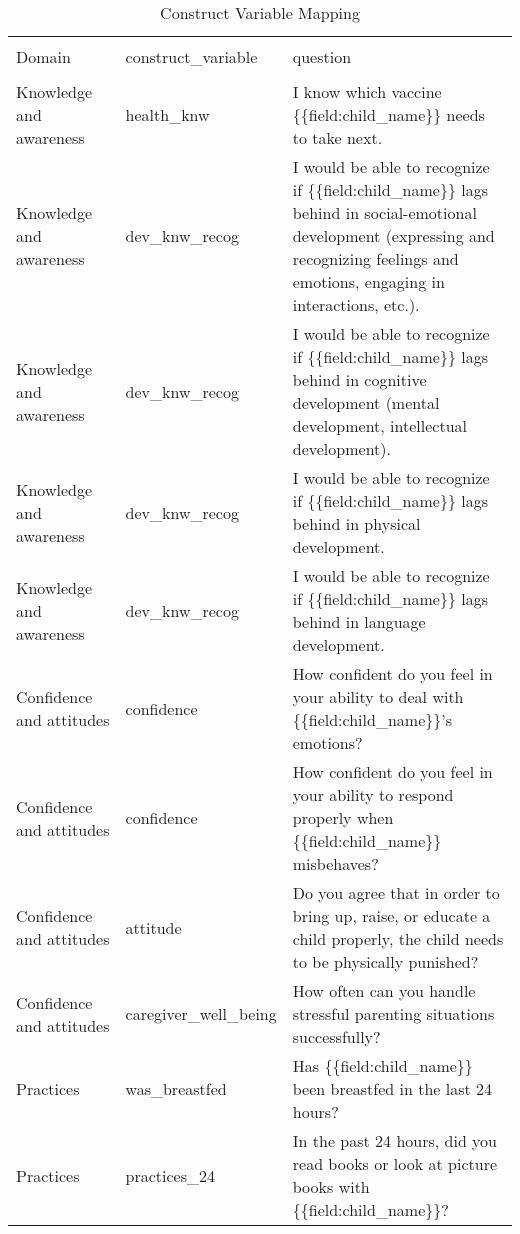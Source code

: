 
\begin{table}[!htbp] \centering
  \caption{Construct Variable Mapping}
  \label{tbl:Construct Variable Mapping}
\begin{tabular}{@{\extracolsep{5pt}} p{0.25\linewidth} p{0.20\linewidth} | p{0.55\linewidth}}
\\[-1.8ex]\hline
\hline \\[-1.8ex]
Domain & construct\_variable & question \\
\hline \\[-1.8ex]
Knowledge and awareness & health\_knw & I know which vaccine \{\{field:child\_name\}\} needs to take next. \\
Knowledge and awareness & dev\_knw\_recog & I would be able to recognize if \{\{field:child\_name\}\}  lags behind in social-emotional development (expressing and recognizing feelings and emotions, engaging in interactions, etc.). \\
Knowledge and awareness & dev\_knw\_recog & I would be able to recognize if \{\{field:child\_name\}\} lags behind in cognitive development (mental development, intellectual development). \\
Knowledge and awareness & dev\_knw\_recog & I would be able to recognize if \{\{field:child\_name\}\} lags behind in physical development. \\
Knowledge and awareness & dev\_knw\_recog & I would be able to recognize if \{\{field:child\_name\}\} lags behind in language development. \\
Confidence and attitudes & confidence & How confident do you feel in your ability to deal with \{\{field:child\_name\}\}’s emotions? \\
Confidence and attitudes & confidence & How confident do you feel in your ability to respond properly when \{\{field:child\_name\}\} misbehaves? \\
Confidence and attitudes & attitude & Do you agree that in order to bring up, raise, or educate a child properly, the child needs to be physically punished? \\
Confidence and attitudes & caregiver\_well\_being & How often can you handle stressful parenting situations successfully? \\
Practices & was\_breastfed & Has \{\{field:child\_name\}\} been breastfed in the last 24 hours? \\
Practices & practices\_24 & In the past 24 hours, did you read books or look at picture books with \{\{field:child\_name\}\}? \\

\end{tabular}
\end{table}
